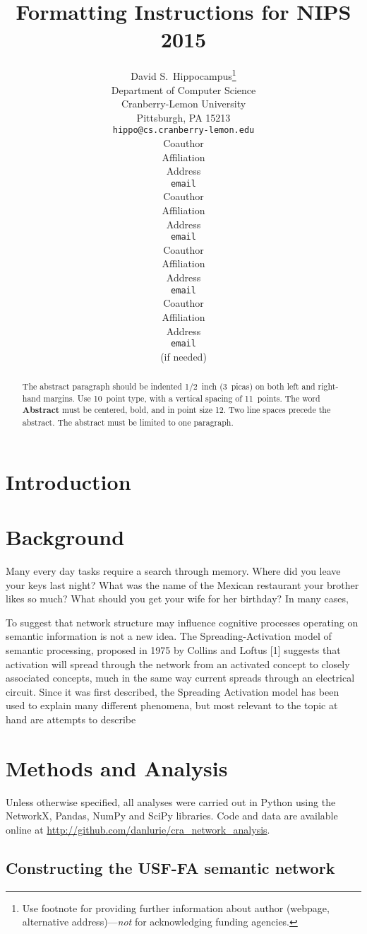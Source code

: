 \documentclass{article} %
\title{Formatting Instructions for NIPS 2015}
\author{
David S.~Hippocampus\thanks{ Use footnote for providing further information
about author (webpage, alternative address)---\emph{not} for acknowledging
funding agencies.} \\
Department of Computer Science\\
Cranberry-Lemon University\\
Pittsburgh, PA 15213 \\
\texttt{hippo@cs.cranberry-lemon.edu} \\
\And
Coauthor \\
Affiliation \\
Address \\
\texttt{email} \\
\AND
Coauthor \\
Affiliation \\
Address \\
\texttt{email} \\
\And
Coauthor \\
Affiliation \\
Address \\
\texttt{email} \\
\And
Coauthor \\
Affiliation \\
Address \\
\texttt{email} \\
(if needed)\\
}
\begin{document}
\maketitle

\begin{abstract}
The abstract paragraph should be indented 1/2~inch (3~picas) on both left and
right-hand margins. Use 10~point type, with a vertical spacing of 11~points.
The word \textbf{Abstract} must be centered, bold, and in point size 12. Two
line spaces precede the abstract. The abstract must be limited to one
paragraph.
\end{abstract}

\section{Introduction}

\section{Background}
\label{background}


Many every day tasks require a search through memory. Where did you leave your keys last night? What was the name of the Mexican restaurant your brother likes so much? What should you get your wife for her birthday? In many cases, 


To suggest that network structure may influence cognitive processes operating on semantic information is not a new idea. The Spreading-Activation model of semantic processing, proposed in 1975 by Collins and Loftus [1] suggests that activation will spread through the network from an activated concept to closely associated concepts, much in the same way current spreads through an electrical circuit. Since it was first described, the Spreading Activation model has been used to explain many different phenomena, but most relevant to the topic at hand are attempts to describe 

\section{Methods and Analysis}
\label{methods-analysis}

Unless otherwise specified, all analyses were carried out in Python using the NetworkX, Pandas, NumPy and SciPy libraries. Code and data are available online at \url{http://github.com/danlurie/cra_network_analysis}.  

\subsection{Constructing the USF-FA semantic network}
\end{document}
